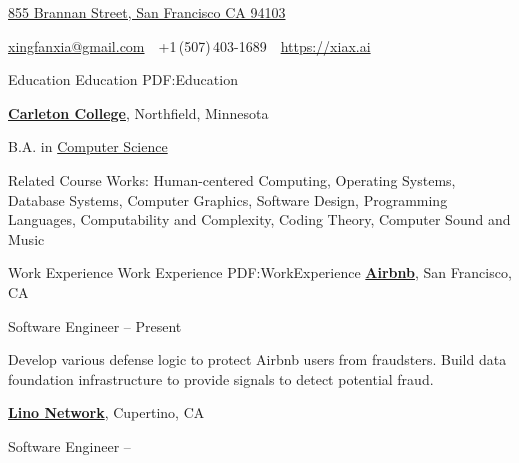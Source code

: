 \documentclass[letterpaper,MMMyyyy,nonstopmode]{simpleresumecv}
\newcommand{\CVAuthor}{Xingfan Xia}
\newcommand{\CVWebpage}{https://xiax.ai}
\begin{document}

\Title{\CVAuthor}

\begin{SubTitle}
\href{https://www.google.com/maps/place/855+Brannan,+San+Francisco,+CA+94103}
{855 Brannan Street, San Francisco CA 94103}
\par
\href{mailto:xingfanxia@gmail.com}
{xingfanxia@gmail.com}
\,\SubBulletSymbol\,
+1\,(507)\,403-1689
\,\SubBulletSymbol\,
\href{\CVWebpage}
{\url{\CVWebpage}}
\end{SubTitle}

\begin{Body}


\Section
{Education}
{Education}
{PDF:Education}

\Entry
\href{https://www.carleton.edu/}
{\textbf{Carleton College}},
Northfield, Minnesota

\Gap
\BulletItem
B.A. in
\href{https://apps.carleton.edu/curricular/cs/}
{Computer Science}
\hfill
{}
\begin{Detail}
\SubBulletItem
Related Course Works: Human-centered Computing, Operating Systems, Database Systems, Computer Graphics, Software Design, Programming Languages, Computability and Complexity, Coding Theory, Computer Sound and Music

\end{Detail}


\Section
{Work\newline
Experience}
{Work Experience}
{PDF:WorkExperience}
\Entry
\href{https://press.airbnb.com/about-us/}
{\textbf{Airbnb}},
San Francisco, CA

\Gap
\BulletItem
Software Engineer
\hfill
{} --
Present
\begin{Detail}
\SubBulletItem
Develop various defense logic to protect Airbnb users from fraudsters.
\SubBulletItem
Build data foundation infrastructure to provide signals to detect potential fraud.
\end{Detail}

\BigGap
\Entry
\href{https://lino.network/}
{\textbf{Lino Network}},
Cupertino, CA

\Gap
\BulletItem
Software Engineer
\hfill
{} --


\end{Body}
\end{document}
